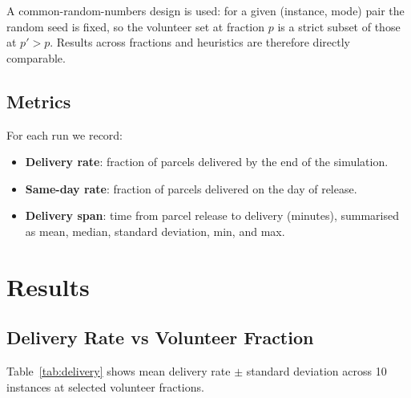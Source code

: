 \documentclass[11pt,a4paper]{article}
\begin{document}
A common-random-numbers design \cite{law2015simulation} is used: for a given
(instance, mode) pair the random seed is fixed, so the volunteer set at
fraction $p$ is a strict subset of those at $p'>p$. Results across fractions
and heuristics are therefore directly comparable.

\subsection{Metrics}

For each run we record:
\begin{itemize}
  \item \textbf{Delivery rate}: fraction of parcels delivered by the end of
        the simulation.
  \item \textbf{Same-day rate}: fraction of parcels delivered on the day of
        release.
  \item \textbf{Delivery span}: time from parcel release to delivery (minutes),
        summarised as mean, median, standard deviation, min, and max.
\end{itemize}

\section{Results}

\subsection{Delivery Rate vs Volunteer Fraction}

Table~\ref{tab:delivery} shows mean delivery rate $\pm$ standard deviation
across 10 instances at selected volunteer fractions.
\end{document}
